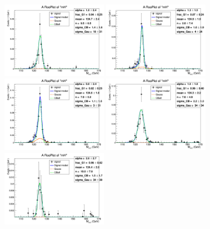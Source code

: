 \begin{figure}
	\begin{center}
		\includegraphics[width=0.40\textwidth]{fig/hmumu/2016/bkgfit_mu_ggF_1_125.png}
		\includegraphics[width=0.40\textwidth]{fig/hmumu/2016/bkgfit_mu_ggF_2_125.png}\\
		\includegraphics[width=0.40\textwidth]{fig/hmumu/2016/bkgfit_mu_ggF_3_125.png}
		\includegraphics[width=0.40\textwidth]{fig/hmumu/2016/bkgfit_mu_ggF_4_125.png}\\
		\includegraphics[width=0.40\textwidth]{fig/hmumu/2016/bkgfit_mu_VBF_501_125.png}

\end{center}
\end{figure}
